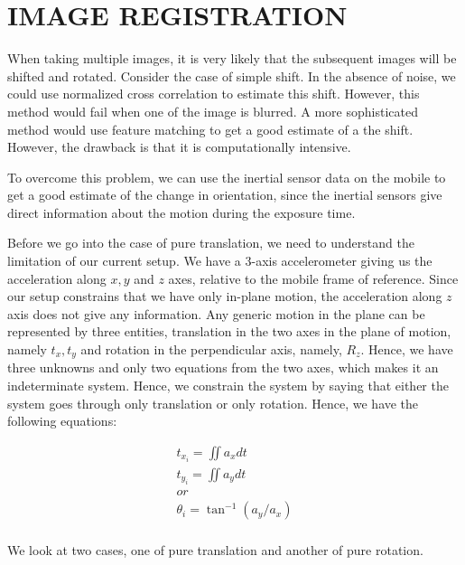 \documentclass[BTech]{iitmdiss}
\begin{document}
\chapter{IMAGE REGISTRATION}
\label{chap:image_registration}
When taking multiple images, it is very likely that the subsequent 
images will be shifted and rotated. Consider the case of simple shift. 
In the absence of noise, we could use normalized cross correlation
to estimate this shift. However, this method would fail when one of the 
image is blurred. A more sophisticated method would use feature matching
to get a good estimate of a the shift. However, the drawback is that it
is computationally intensive.

To overcome this problem, we can use the inertial sensor data on the 
mobile to get a good estimate of the change in orientation, since the 
inertial sensors give direct information about the motion during the 
exposure time. 

Before we go into the case of pure translation, we need to understand 
the limitation of our current setup. We have a 3-axis accelerometer 
giving us the acceleration along ${x, y}$ and $z$ axes, relative to
the mobile frame of reference. Since our setup constrains that we have
only in-plane motion, the acceleration along $z$ axis does not give 
any information. Any generic motion in the plane can be represented by
three entities, translation in the two axes in the plane of motion, namely ${t_x, t_y}$ and rotation in the perpendicular axis, namely, $R_z$. Hence, we have three unknowns and only two equations from the two axes, which makes it an 
indeterminate system. Hence, we constrain the system by saying that
either the system goes through only translation or only rotation. Hence,
we have the following equations:

\begin{align}
t_{x_i}=\iint{a_x}dt\\
t_{y_i}=\iint{a_y}dt\\
or\\
{\theta}_i=\tan^{-1}({a_y}/{a_x})\\
\end{align}

We look at two cases, one of pure translation and another of pure 
rotation.
\end{document}
